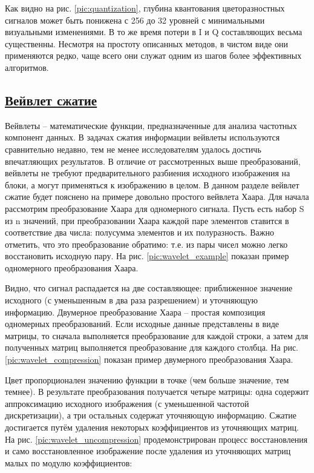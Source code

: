 Как видно на рис. \ref{pic:quantization}, глубина квантования цветоразностных сигналов может быть понижена с 256 до 32 уровней с минимальными визуальными изменениями. В то же время потери в I и Q составляющих весьма существенны. Несмотря на простоту описанных методов, в чистом виде они применяются редко, чаще всего они служат одним из шагов более эффективных алгоритмов.

\subsection*{\hyperlink{toc}{Вейвлет сжатие}}

Вейвлеты – математические функции, предназначенные для анализа частотных компонент данных. В задачах сжатия информации вейвлеты используются сравнительно недавно, тем не менее исследователям удалось достичь впечатляющих результатов.
В отличие от рассмотренных выше преобразований, вейвлеты не требуют предварительного разбиения исходного изображения на блоки, а могут применяться к изображению в целом. В данном разделе вейвлет сжатие будет пояснено на примере довольно простого вейвлета Хаара.
Для начала рассмотрим преобразование Хаара для одномерного сигнала. Пусть есть набор S из n значений, при преобразовании Хаара каждой паре элементов ставится в соответствие два числа: полусумма элементов и их полуразность. Важно отметить, что это
 преобразование обратимо: т.е. из пары чисел можно легко восстановить исходную пару. На рис. \ref{pic:wavelet_example} показан пример одномерного преобразования Хаара.


Видно, что сигнал распадается на две составляющее: приближенное значение исходного (с уменьшенным в два раза разрешением) и уточняющую информацию.
Двумерное преобразование Хаара – простая композиция одномерных преобразований. Если исходные данные представлены в виде матрицы, то сначала выполняется преобразование для каждой строки, а затем для полученных матриц выполняется преобразование для каждого столбца. На рис. \ref{pic:wavelet_compression} показан пример двумерного преобразования Хаара.


Цвет пропорционален значению функции в точке (чем больше значение, тем темнее). В результате преобразования получается четыре матрицы: одна содержит аппроксимацию исходного изображения (с уменьшенной частотой дискретизации), а три остальных содержат уточняющую информацию.
Сжатие достигается путём удаления некоторых коэффициентов из уточняющих матриц. На рис. \ref {pic:wavelet_uncompression} продемонстрирован процесс восстановления и само восстановленное изображение после удаления из уточняющих матриц малых по модулю коэффициентов:

